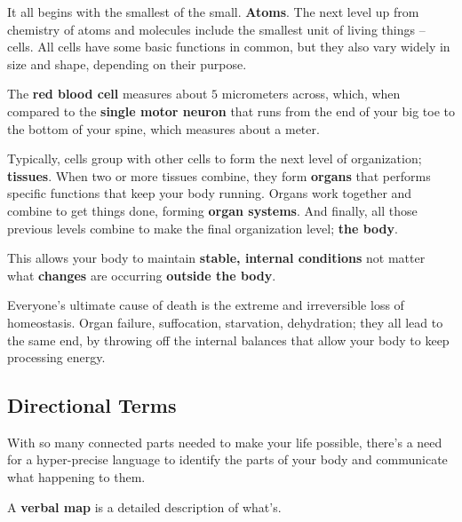 It all begins with the smallest of the small. \textbf{Atoms}. The next level up
from chemistry of atoms and molecules include the smallest unit of living
things -- cells. All cells have some basic functions in common, but they also
vary widely in size and shape, depending on their purpose.

\begin{example}
	\label{exm:cells}

	The \textbf{red blood cell} measures about $5$ micrometers across, which,
	when compared to the \textbf{single motor neuron} that runs from the end of
	your big toe to the bottom of your spine, which measures about a meter.
\end{example}

Typically, cells group with other cells to form the next level of organization;
\textbf{tissues}. When two or more tissues combine, they form \textbf{organs}
that performs specific functions that keep your body running. Organs work
together and combine to get things done, forming \textbf{organ systems}. And
finally, all those previous levels combine to make the final organization
level; \textbf{the body}.

\begin{definition}[Homeostasis]
	\label{def:homeostasis}

	This allows your body to maintain \textbf{stable, internal conditions} not
	matter what \textbf{changes} are occurring \textbf{outside the body}.
\end{definition}

Everyone's ultimate cause of death is the extreme and irreversible loss of
homeostasis. Organ failure, suffocation, starvation, dehydration; they all lead
to the same end, by throwing off the internal balances that allow your body to
keep processing energy.


\subsection*{Directional Terms}
\label{sub_sec:directional_terms}

With so many connected parts needed to make your life possible, there's a need
for a hyper-precise language to identify the parts of your body and communicate
what happening to them.

\begin{definition}
	\label{def:verbal_map}

	A \textbf{verbal map} is a detailed description of what's.
\end{definition}

